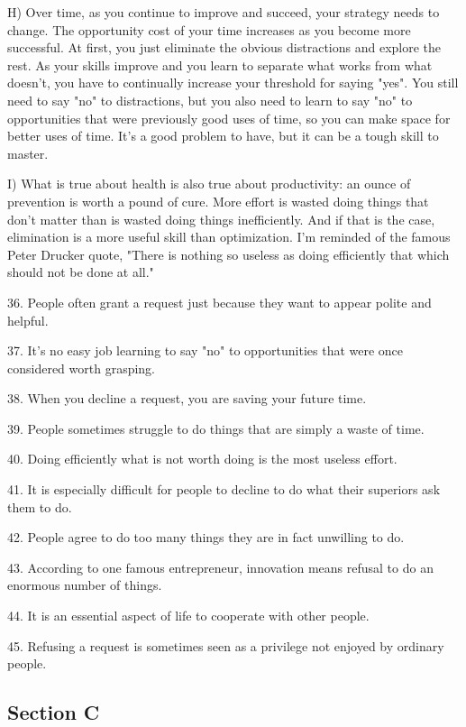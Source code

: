 \documentclass[UTF8,11pt]{ctexart}
\begin{document}
H) Over time, as you continue to improve and succeed, your strategy needs to change. The opportunity cost of your time increases as you become more successful. At first, you just eliminate the obvious distractions and explore the rest. As your skills improve and you learn to separate what works from what doesn't, you have to continually increase your threshold for saying "yes". You still need to say "no" to distractions, but you also need to learn to say "no" to opportunities that were previously good uses of time, so you can make space for better uses of time. It's a good problem to have, but it can be a tough skill to master.


I) What is true about health is also true about productivity: an ounce of prevention is worth a pound of cure. More effort is wasted doing things that don't matter than is wasted doing things inefficiently. And if that is the case, elimination is a more useful skill than optimization. I'm reminded of the famous Peter Drucker quote, "There is nothing so useless as doing efficiently that which should not be done at all."


36. People often grant a request just because they want to appear polite and helpful.


37. It's no easy job learning to say "no" to opportunities that were once considered worth grasping.


38. When you decline a request, you are saving your future time.


39. People sometimes struggle to do things that are simply a waste of time.


40. Doing efficiently what is not worth doing is the most useless effort.


41. It is especially difficult for people to decline to do what their superiors ask them to do.


42. People agree to do too many things they are in fact unwilling to do.


43. According to one famous entrepreneur, innovation means refusal to do an enormous number of things.


44. It is an essential aspect of life to cooperate with other people.


45. Refusing a request is sometimes seen as a privilege not enjoyed by ordinary people.


\subsection*{\textbf{Section C}}
\end{document}
